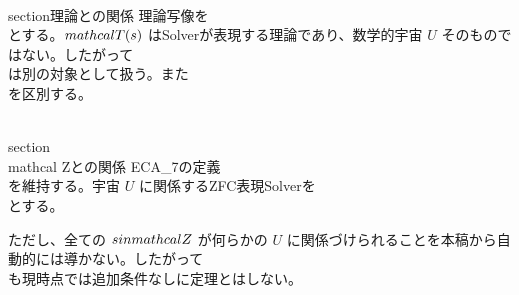 \documentclass[11pt,a4paper]{article}
\begin{document}
\\section{理論との関係}
理論写像を
\\[
\\mathcal T:\\Solver_I\\to\\mathrm{Th}
\\]
とする。$\\mathcal T(s)$ はSolverが表現する理論であり、数学的宇宙 $U$ そのものではない。したがって
\\[
U,\\qquad s,\\qquad\\mathcal T(s)
\\]
は別の対象として扱う。また
\\[
s=t,\\qquad s\\cong_{\\mathrm{Sol}}t,\\qquad \\mathcal T(s)\\cong_{\\mathrm{Th}}\\mathcal T(t)
\\]
を区別する。

\\section{\\mathcal Zとの関係}
ECA_7の定義
\\[
\\mathcal Z=\\{s\\in\\Solver_I\\mid\\mathcal T(s)\\cong_{\\mathrm{Th}}\\mathrm{ZFC}\\}
\\]
を維持する。宇宙 $U$ に関係するZFC表現Solverを
\\[
\\mathcal Z(U)=\\mathcal Z\\cap\\Solver(U)
\\]
とする。

ただし、全ての $s\\in\\mathcal Z$ が何らかの $U$ に関係づけられることを本稿から自動的には導かない。したがって
\\[
\\mathcal Z=\\bigcup_U\\mathcal Z(U)
\\]
も現時点では追加条件なしに定理とはしない。
\end{document}
